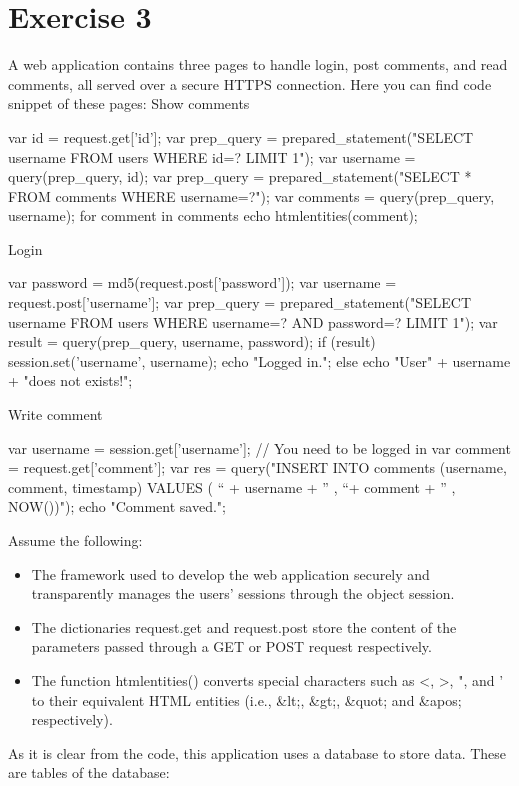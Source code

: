 \section{Exercise 3}

A web application contains three pages to handle login, post comments, and read comments, all served over a secure HTTPS connection.
Here you can find code snippet of these pages:
Show comments
\begin{verbnobox}[\verbarg]
var id = request.get['id'];
var prep_query = prepared_statement("SELECT username FROM users WHERE id=? LIMIT 1");
var username = query(prep_query, id);
var prep_query = prepared_statement("SELECT * FROM comments WHERE username=?");
var comments = query(prep_query, username);
for comment in comments {
    echo htmlentities(comment);
}   
\end{verbnobox}
Login 
\begin{verbnobox}[\verbarg]
var password = md5(request.post['password']);
var username = request.post['username'];
var prep_query = prepared_statement("SELECT username FROM users WHERE username=? AND password=? LIMIT 1");
var result = query(prep_query, username, password);
if (result) {
    session.set('username', username);
    echo "Logged in.";
} else {
    echo "User" + username + "does not exists!";
}
\end{verbnobox}
Write comment
\begin{verbnobox}[\verbarg]
var username = session.get['username']; // You need to be logged in
var comment = request.get['comment'];
var res = query("INSERT INTO comments (username, comment, timestamp) VALUES ( “ + username + ” , “+ comment + ” , NOW())");
    echo "Comment saved.";
\end{verbnobox}
Assume the following:
\begin{itemize}
    \item The framework used to develop the web application securely and transparently manages the users' sessions through the object session.
    \item The dictionaries request.get and request.post store the content of the parameters passed through a GET or POST request respectively. 
    \item The function htmlentities() converts special characters such as <, >, ", and ' to their equivalent HTML entities (i.e., \&lt;, \&gt;, \&quot; and \&apos; respectively).
\end{itemize}
As it is clear from the code, this application uses a database to store data.
These are tables of the database:
